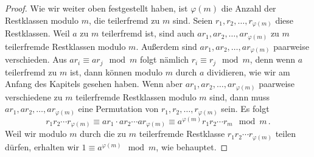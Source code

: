 \begin{proof}
	Wie wir weiter oben festgestellt haben, ist $\varphi(m)$ die Anzahl der Restklassen modulo $m$, die teilerfremd zu $m$ sind. Seien $r_1,r_2,\dotsc,r_{\varphi(m)}$ diese Restklassen. Weil $a$ zu $m$ teilerfremd ist, sind auch $ar_1,ar_2,\dotsc,ar_{\varphi(m)}$ zu $m$ teilerfremde Restklassen modulo $m$. Außerdem sind $ar_1,ar_2,\dotsc,ar_{\varphi(m)}$ paarweise verschieden. Aus $ar_i\equiv ar_j\mod m$ folgt nämlich $r_i\equiv r_j\mod m$, denn wenn $a$ teilerfremd zu $m$ ist, dann können modulo $m$ durch $a$ dividieren, wie wir am Anfang des Kapitels gesehen haben. Wenn aber $ar_1,ar_2,\dotsc,ar_{\varphi(m)}$ paarweise verschiedene zu $m$ teilerfremde Restklassen modulo $m$ sind, dann muss $ar_1,ar_2,\dotsc,ar_{\varphi(m)}$ eine Permutation von $r_1,r_2,\dotsc,r_{\varphi(m)}$ sein. Es folgt
	\begin{equation*}
		r_1r_2\dotsb r_{\varphi(m)}\equiv ar_1\cdot ar_2\dotsm ar_{\varphi(m)}\equiv a^{\varphi(m)}r_1r_2\dotsm r_m\mod m\,.
	\end{equation*}
	Weil wir modulo $m$ durch die zu $m$ teilerfremde Restklasse $r_1r_2\dotsm r_{\varphi(m)}$ teilen dürfen, erhalten wir $1\equiv a^{\varphi(m)}\mod m$, wie behauptet.
\end{proof}

